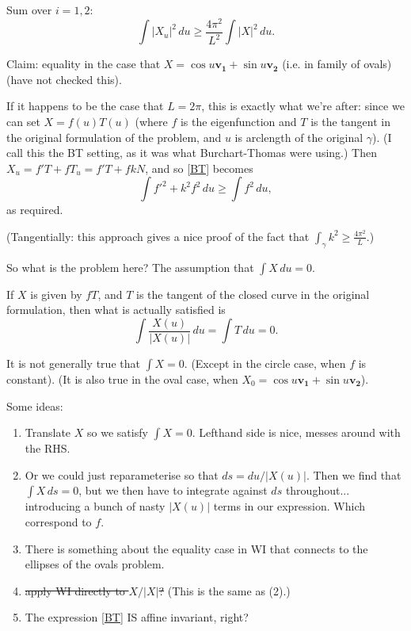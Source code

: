 \documentclass{amsart}
\begin{document}
Sum over $i=1,2$: 
\[ \label{BT} \int |X_u|^2 \,du \ge \frac{4\pi^2}{L^2}\int |X|^2\,du .  \tag{BT}\]

Claim: equality in the case that $X=\cos u \mathbf{v_1}+ \sin u \mathbf{v_2}$ (i.e. in family of ovals) (have not checked this).

If it happens to be the case that $L=2\pi$, this is exactly what we're after:  since we can set $X=f(u)T(u)$ (where $f$ is the eigenfunction and $T$ is the tangent in the original formulation of the problem, and $u$ is arclength of the original $\gamma$).  (I call this the BT setting, as it was what Burchart-Thomas were using.)  Then $X_u= f' T+ fT_u= f'T+ fkN$, and so \eqref{BT} becomes
\[ \int f'^2 + k^2 f^2 \,du \ge \int f^2\,du, \]
as required.

(Tangentially:   this approach gives a nice proof of the fact that $\int_\gamma k^2 \ge \frac{4\pi^2}L$.)

So what is the problem here?  The assumption that $\int X \,du=0$.   

If $X$ is given by $fT$, and $T$ is the tangent of the closed curve in the original formulation, then what is actually satisfied is 
\begin{equation} \label{tangent of loop} \int \frac{X(u)}{|X(u)|}\,du = \int T \,du= 0.\end{equation}

It is not generally true that $\int X=0$.   (Except in the circle case, when $f$ is constant).   (It is also true in the oval case, when $X_0=\cos u \mathbf{v_1}+ \sin u \mathbf{v_2}$).   

Some ideas:   
\begin{enumerate}
\item Translate $X$ so we satisfy $\int X=0$.  Lefthand side is nice, messes around with the RHS. \label{translate}

\item Or we could just reparameterise so that $ds=du/|X(u)|$.   Then we find that $\int X \,ds=0$, but we then have to integrate against $ds$ throughout... introducing a bunch of nasty $|X(u)|$ terms in our expression.     Which correspond to $f$.

\item There is something about the equality case in WI that connects to the ellipses of the ovals problem.

\item \sout{apply WI directly to $X/|X|$?} (This is the same as (2).)  

\item The expression \eqref{BT} IS affine invariant, right?



\end{enumerate}
\end{document}
